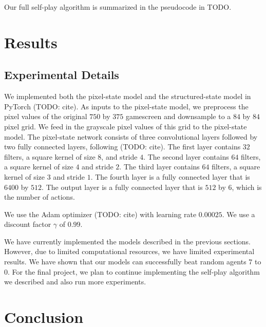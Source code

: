 \documentclass[10pt,twocolumn,letterpaper]{article}
\begin{document}
Our full self-play algorithm is summarized in the pseudocode in TODO.

\section{Results}

\subsection{Experimental Details}
We implemented both the pixel-state model and the structured-state model in
PyTorch (TODO: cite). As inputs to the pixel-state model, we preprocess the
pixel values of the original $750$ by $375$ gamescreen and downsample to a $84$
by $84$ pixel grid. We feed in the grayscale pixel values of this grid to the
pixel-state model. The pixel-state network consists of three convolutional
layers followed by two fully connected layers, following (TODO: cite). The first
layer contains $32$ filters, a square kernel of size $8$, and stride $4$. The
second layer contains $64$ filters, a square kernel of size $4$ and stride
$2$. The third layer contains $64$ filters, a square kernel of size $3$ and
stride $1$. The fourth layer is a fully connected layer that is $6400$ by
$512$. The output layer is a fully connected layer that is $512$ by $6$, which
is the number of actions.

We use the Adam optimizer (TODO: cite) with learning rate $0.00025$. We use a
discount factor $\gamma$ of $0.99$.


We have currently implemented the models described in the previous sections.
However, due to limited computational resources, we have limited experimental
results. We have shown that our models can successfully beat random agents $7$
to $0$. For the final project, we plan to continue implementing the self-play
algorithm we described and also run more experiments.

\section{Conclusion}

{\small


}
\end{document}
